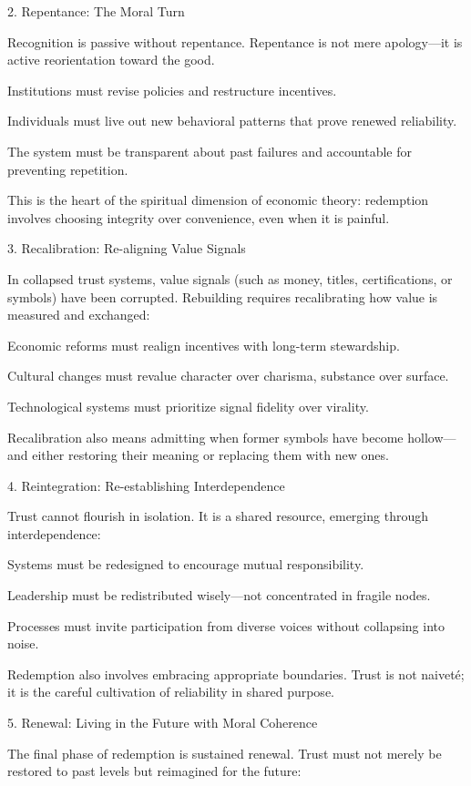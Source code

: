 \documentclass[11pt,oneside]{book}
\begin{document}
2. Repentance: The Moral Turn


Recognition is passive without repentance. Repentance is not mere apology—it is active reorientation toward the good.

    Institutions must revise policies and restructure incentives.

    Individuals must live out new behavioral patterns that prove renewed reliability.

    The system must be transparent about past failures and accountable for preventing repetition.

This is the heart of the spiritual dimension of economic theory: redemption involves choosing integrity over convenience, even when it is painful.

3. Recalibration: Re-aligning Value Signals


In collapsed trust systems, value signals (such as money, titles, certifications, or symbols) have been corrupted. Rebuilding requires recalibrating how value is measured and exchanged:

    Economic reforms must realign incentives with long-term stewardship.

    Cultural changes must revalue character over charisma, substance over surface.

    Technological systems must prioritize signal fidelity over virality.

Recalibration also means admitting when former symbols have become hollow—and either restoring their meaning or replacing them with new ones.

4. Reintegration: Re-establishing Interdependence


Trust cannot flourish in isolation. It is a shared resource, emerging through interdependence:

    Systems must be redesigned to encourage mutual responsibility.

    Leadership must be redistributed wisely—not concentrated in fragile nodes.

    Processes must invite participation from diverse voices without collapsing into noise.

Redemption also involves embracing appropriate boundaries. Trust is not naiveté; it is the careful cultivation of reliability in shared purpose.

5. Renewal: Living in the Future with Moral Coherence


The final phase of redemption is sustained renewal. Trust must not merely be restored to past levels but reimagined for the future:
\end{document}
